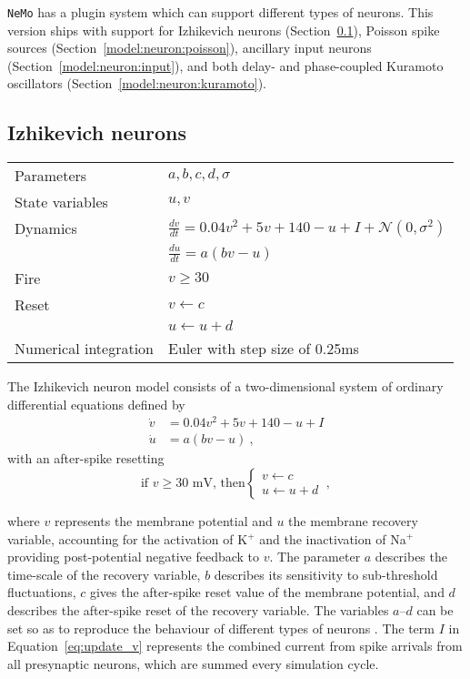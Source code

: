 \documentclass[a4paper]{article}
\newcommand{\nemo}{\texttt{NeMo}\xspace}
\begin{document}
\nemo has a plugin system which can support different types of neurons.  This
version ships with support for Izhikevich neurons
(Section~\ref{model:neuron:izhikevich}), Poisson spike sources
(Section~\ref{model:neuron:poisson}), ancillary input neurons
(Section~\ref{model:neuron:input}), and both delay- and phase-coupled Kuramoto
oscillators (Section~\ref{model:neuron:kuramoto}).

\subsection{Izhikevich neurons}
\label{model:neuron:izhikevich}

\begin{tabular}{ll}
Parameters      & $a, b, c, d, \sigma$                 \\
State variables & $u, v$                               \\
Dynamics        & $\frac{dv}{dt} = 0.04v^2+5v+140-u+I + \mathcal{N}(0,\sigma^2)$ \\
                & $\frac{du}{dt} = a(bv-u)$            \\
Fire            & $v \ge 30$                           \\
Reset           & $v\leftarrow c$                      \\
                & $u\leftarrow u+d$                    \\
Numerical integration & Euler with step size of 0.25ms \\
\end{tabular}

The Izhikevich neuron model 
\cite{izhikevich2003simple_model}
consists of a two-dimensional system of ordinary differential equations defined by
\begin{align}
	\dot{v} & = 0.04v^2+5v+140-u+I    \label{eq:update_v} \\
	\dot{u} & = a(bv-u) ~,            \label{eq:update_u}
\end{align}
with an after-spike resetting
\begin{equation}
\label{eq:reset}
\text{if }v\ge30\text{ mV, then}\begin{cases}v\leftarrow c\\u\leftarrow u+d\end{cases} ~,
\end{equation}

where $v$ represents the membrane potential and $u$ the membrane recovery
variable, accounting for the activation of K$^+$ and the inactivation of Na$^+$
providing post-potential negative feedback to $v$. The parameter $a$ describes
the time-scale of the recovery variable, $b$ describes its sensitivity to
sub-threshold fluctuations, $c$ gives the after-spike reset value of the
membrane potential, and $d$ describes the after-spike reset of the recovery
variable.  The variables $a$--$d$ can be set so as to reproduce the behaviour
of different types of neurons \cite{izhikevich2003simple_model}. The term $I$
in Equation~\ref{eq:update_v} represents the combined current from spike
arrivals from all presynaptic neurons, which are summed every simulation cycle.
\end{document}
